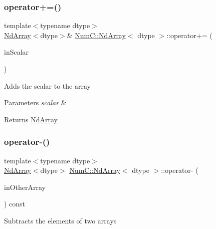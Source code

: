\subsubsection{\texorpdfstring{operator+=()}{operator+=()}\hspace{0.1cm}{\footnotesize\ttfamily [2/2]}}
{\footnotesize\ttfamily template$<$typename dtype$>$ \\
\mbox{\hyperlink{class_num_c_1_1_nd_array}{Nd\+Array}}$<$dtype$>$\& \mbox{\hyperlink{class_num_c_1_1_nd_array}{Num\+C\+::\+Nd\+Array}}$<$ dtype $>$\+::operator+= (\begin{DoxyParamCaption}\item[{dtype}]{in\+Scalar }\end{DoxyParamCaption})\hspace{0.3cm}{\ttfamily [inline]}}

Adds the scalar to the array


\begin{DoxyParams}{Parameters}
{\em scalar} & \\
\hline
\end{DoxyParams}
\begin{DoxyReturn}{Returns}
\mbox{\hyperlink{class_num_c_1_1_nd_array}{Nd\+Array}} 
\end{DoxyReturn}
\mbox{\label{class_num_c_1_1_nd_array_aa5625d7239485a21fd2cc59cec55dfb2}} 
\subsubsection{\texorpdfstring{operator-\/()}{operator-()}\hspace{0.1cm}{\footnotesize\ttfamily [1/2]}}
{\footnotesize\ttfamily template$<$typename dtype$>$ \\
\mbox{\hyperlink{class_num_c_1_1_nd_array}{Nd\+Array}}$<$dtype$>$ \mbox{\hyperlink{class_num_c_1_1_nd_array}{Num\+C\+::\+Nd\+Array}}$<$ dtype $>$\+::operator-\/ (\begin{DoxyParamCaption}\item[{const \mbox{\hyperlink{class_num_c_1_1_nd_array}{Nd\+Array}}$<$ dtype $>$ \&}]{in\+Other\+Array }\end{DoxyParamCaption}) const\hspace{0.3cm}{\ttfamily [inline]}}

Subtracts the elements of two arrays


